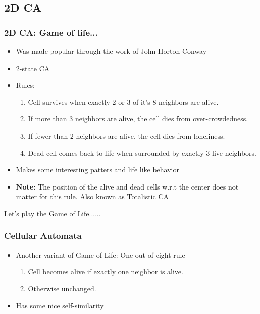 \documentclass{beamer}
\begin{document}
\subsection{2D CA}
\begin{frame}
    \frametitle{2D CA: Game of life...}
    \begin{itemize}
        \item Was made popular through the work of John Horton Conway
        \item 2-state CA
        \item Rules:
        \begin{enumerate}
            \item Cell survives when exactly 2 or 3 of it's 8 neighbors are alive.
            \item If more than 3 neighbors are alive, the cell dies from over-crowdedness.
            \item If fewer than 2 neighbors are alive, the cell dies from loneliness.
            \item Dead cell comes back to life when surrounded by exactly 3 live neighbors.  
        \end{enumerate}
        \item Makes some interesting patters and life like behavior 
        \item \textbf{Note:} The position of the alive and dead cells w.r.t the center does not matter for this rule. Also known as Totalistic CA
    \end{itemize}
\end{frame}

\begin{frame}
    \centering
    Let's play the Game of Life......
\end{frame}

\begin{frame}
    \frametitle{Cellular Automata}
    \begin{itemize}
        \item Another variant of Game of Life: One out of eight rule
        \begin{enumerate}
            \item Cell becomes alive if exactly one neighbor is alive.
            \item Otherwise unchanged.
        \end{enumerate}
        \item Has some nice self-similarity
    \end{itemize}
\end{frame}
\end{document}
